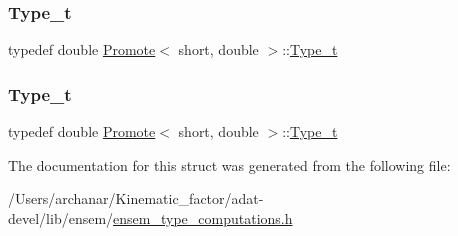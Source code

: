 \subsubsection{\texorpdfstring{Type\_t}{Type\_t}\hspace{0.1cm}{\footnotesize\ttfamily [2/3]}}
{\footnotesize\ttfamily typedef double \mbox{\hyperlink{structPromote}{Promote}}$<$ short, double $>$\+::\mbox{\hyperlink{structPromote_3_01short_00_01double_01_4_ac1a01602078262e2918f806dee9199c4}{Type\+\_\+t}}}

\mbox{\label{structPromote_3_01short_00_01double_01_4_ac1a01602078262e2918f806dee9199c4}} 
\subsubsection{\texorpdfstring{Type\_t}{Type\_t}\hspace{0.1cm}{\footnotesize\ttfamily [3/3]}}
{\footnotesize\ttfamily typedef double \mbox{\hyperlink{structPromote}{Promote}}$<$ short, double $>$\+::\mbox{\hyperlink{structPromote_3_01short_00_01double_01_4_ac1a01602078262e2918f806dee9199c4}{Type\+\_\+t}}}



The documentation for this struct was generated from the following file\+:\begin{DoxyCompactItemize}
\item 
/\+Users/archanar/\+Kinematic\+\_\+factor/adat-\/devel/lib/ensem/\mbox{\hyperlink{adat-devel_2lib_2ensem_2ensem__type__computations_8h}{ensem\+\_\+type\+\_\+computations.\+h}}\end{DoxyCompactItemize}
